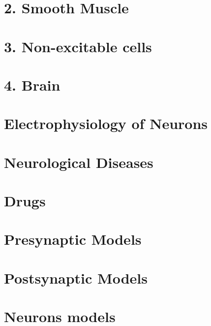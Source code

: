 \documentclass[11pt]{book}
\begin{document}
\part{2. Smooth Muscle}


\part{3. Non-excitable cells}


\part{4. Brain}







\part{Electrophysiology of Neurons}


%
 



\part{Neurological Diseases}






\part{Drugs}


\part{Presynaptic Models}


\part{Postsynaptic Models}





\part{Neurons models}









\end{document}
